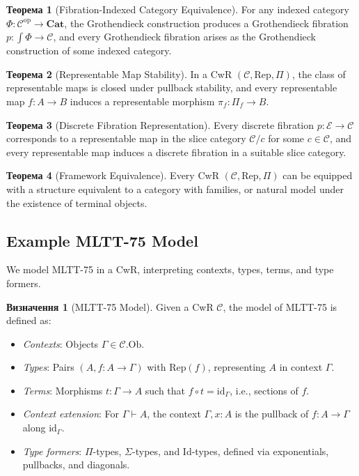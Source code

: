 \documentclass{article}
\theoremstyle{definition}
\newtheorem{definition}{Визначення}[section]
\newtheorem{theorem}{Теорема}[section]
\begin{document}
\begin{theorem}[Fibration-Indexed Category Equivalence]
For any indexed category \(\Phi : \mathcal{C}^{\mathrm{op}} \to \mathbf{Cat}\), the Grothendieck construction produces a Grothendieck fibration \(p : \int \Phi \to \mathcal{C}\), and every Grothendieck fibration arises as the Grothendieck construction of some indexed category.
\end{theorem}

\begin{theorem}[Representable Map Stability]
In a CwR \((\mathcal{C}, \mathrm{Rep}, \Pi)\), the class of representable maps is closed under pullback stability, and every representable map \(f : A \to B\) induces a representable morphism \(\pi_f : \Pi_f \to B\).
\end{theorem}

\begin{theorem}[Discrete Fibration Representation]
Every discrete fibration \(p : \mathcal{E} \to \mathcal{C}\) corresponds to a representable map in the slice category \(\mathcal{C}/c\) for some \(c \in \mathcal{C}\), and every representable map induces a discrete fibration in a suitable slice category.
\end{theorem}

\begin{theorem}[Framework Equivalence]
Every CwR \((\mathcal{C}, \mathrm{Rep}, \Pi)\) can be equipped with a
structure equivalent to a category with families,
or natural model under the existence of terminal objects.
\end{theorem}

\newpage
\subsection{Example MLTT-75 Model}

We model MLTT-75 in a CwR, interpreting contexts, types, terms, and type formers.

\begin{definition}[MLTT-75 Model]
Given a CwR $\mathcal{C}$, the model of MLTT-75 is defined as:
\begin{itemize}
  \item \emph{Contexts}: Objects $\Gamma \in \mathcal{C}.\text{Ob}$.
  \item \emph{Types}: Pairs $(A, f : A \to \Gamma)$ with $\text{Rep}(f)$, representing $A$ in context $\Gamma$.
  \item \emph{Terms}: Morphisms $t : \Gamma \to A$ such that $f \circ t = \text{id}_\Gamma$, i.e., sections of $f$.
  \item \emph{Context extension}: For $\Gamma \vdash A$, the context $\Gamma, x : A$ is the pullback of $f : A \to \Gamma$ along $\text{id}_\Gamma$.
  \item \emph{Type formers}: $\Pi$-types, $\Sigma$-types, and Id-types, defined via exponentials, pullbacks, and diagonals.
\end{itemize}
\end{definition}
\end{document}
